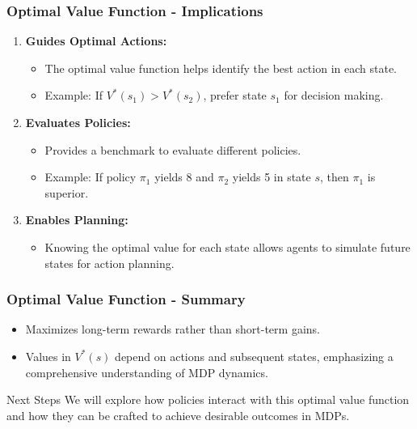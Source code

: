 \documentclass[aspectratio=169]{beamer}
\begin{document}
\begin{frame}[fragile]
    \frametitle{Optimal Value Function - Implications}
    \begin{enumerate}
        \item \textbf{Guides Optimal Actions:}
            \begin{itemize}
                \item The optimal value function helps identify the best action in each state.
                \item Example: If \(V^*(s_1) > V^*(s_2)\), prefer state \(s_1\) for decision making.
            \end{itemize}
        
        \item \textbf{Evaluates Policies:}
            \begin{itemize}
                \item Provides a benchmark to evaluate different policies.
                \item Example: If policy \(\pi_1\) yields 8 and \(\pi_2\) yields 5 in state \(s\), then \(\pi_1\) is superior.
            \end{itemize}
        
        \item \textbf{Enables Planning:}
            \begin{itemize}
                \item Knowing the optimal value for each state allows agents to simulate future states for action planning.
            \end{itemize}
    \end{enumerate}
\end{frame}

\begin{frame}[fragile]
    \frametitle{Optimal Value Function - Summary}
    \begin{itemize}
        \item Maximizes long-term rewards rather than short-term gains.
        \item Values in \(V^*(s)\) depend on actions and subsequent states, emphasizing a comprehensive understanding of MDP dynamics.
    \end{itemize}

    \begin{block}{Next Steps}
        We will explore how policies interact with this optimal value function and how they can be crafted to achieve desirable outcomes in MDPs.
    \end{block}
\end{frame}
\end{document}
